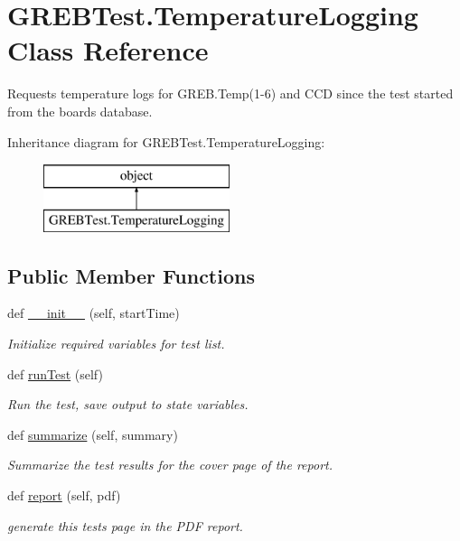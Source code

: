 \hypertarget{class_g_r_e_b_test_1_1_temperature_logging}{}\section{G\+R\+E\+B\+Test.\+Temperature\+Logging Class Reference}
\label{class_g_r_e_b_test_1_1_temperature_logging}


Requests temperature logs for G\+R\+E\+B.\+Temp(1-\/6) and C\+CD since the test started from the board\textquotesingle{}s database.  


Inheritance diagram for G\+R\+E\+B\+Test.\+Temperature\+Logging\+:\begin{figure}[H]
\begin{center}
\leavevmode
\includegraphics[height=2.000000cm]{class_g_r_e_b_test_1_1_temperature_logging}
\end{center}
\end{figure}
\subsection*{Public Member Functions}
\begin{DoxyCompactItemize}
\item 
def \hyperlink{class_g_r_e_b_test_1_1_temperature_logging_a838e9b53c199d5ecab913bd9efd8e575}{\+\_\+\+\_\+init\+\_\+\+\_\+} (self, start\+Time)
\begin{DoxyCompactList}\small\item\em Initialize required variables for test list. \end{DoxyCompactList}\item 
def \hyperlink{class_g_r_e_b_test_1_1_temperature_logging_a35a95e04c075201d23923cd26fe96a41}{run\+Test} (self)
\begin{DoxyCompactList}\small\item\em Run the test, save output to state variables. \end{DoxyCompactList}\item 
def \hyperlink{class_g_r_e_b_test_1_1_temperature_logging_ac91eed8fa0bd394d2ca2cae2eb7b4a2c}{summarize} (self, summary)
\begin{DoxyCompactList}\small\item\em Summarize the test results for the cover page of the report. \end{DoxyCompactList}\item 
def \hyperlink{class_g_r_e_b_test_1_1_temperature_logging_abe626c38e37de9a7d00054c6bf11d217}{report} (self, pdf)
\begin{DoxyCompactList}\small\item\em generate this test\textquotesingle{}s page in the P\+DF report. \end{DoxyCompactList}\end{DoxyCompactItemize}


